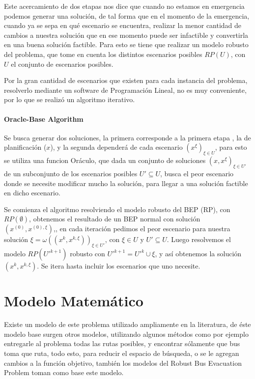 \documentclass[letter, 10pt]{article}
\begin{document}
Este acercamiento de dos etapas nos dice que cuando no estamos en emergencia podemos generar una solución, de tal forma que en el momento de la emergencia, cuando ya se sepa en qué escenario se encuentra, realizar la menor cantidad de cambios a nuestra solución que en ese momento puede ser infactible y convertirla en una buena solución factible. Para esto se tiene que realizar un modelo robusto del problema, que tome en cuenta los distintos escenarios posibles $RP(U)$, con $U$ el conjunto de escenarios posibles.

Por la gran cantidad de escenarios que existen para cada instancia del problema, resolverlo mediante un software de Programación Lineal, no es muy conveniente, por lo que se realizó un algoritmo iterativo.

\paragraph{Oracle-Base Algorithm}
Se busca generar dos soluciones, la primera corresponde a la primera etapa , la de planificación ($x$), y la segunda dependerá de cada escenario $(x^\xi)_{\xi \in U}$, para esto se utiliza una funcion Oráculo, que dada un conjunto de soluciones $(x,x^\xi)_{\xi \in U'}$ de un subconjunto de los escenarios posibles $U' \subseteq U$, busca el peor escenario donde se necesite modificar mucho la solución, para llegar a una solución factible en dicho escenario.

Se comienza el algoritmo resolviendo el modelo robusto del BEP (RP), con $RP(\emptyset)$, obtenemos el resultado de un BEP normal con solución $(x^{(0)},x^{(0),\xi}) $,, en cada iteración pedimos el peor escenario para nuestra solución $\xi = \omega((x^k , x^{k,\xi}))_{\xi \in U'}$, con $\xi \in U$ y $U' \subseteq U$. Luego resolvemos el modelo $RP(U'^{k+1})$ robusto con $U'^{k+1} = U'^{k} \cup \xi$, y así obtenemos la solución $(x^k, x^{k,\xi})$. Se itera hasta incluir los escenarios que uno necesite.


\section{Modelo Matem\'atico}
Existe un modelo de este problema utilizado ampliamente en la literatura, de éste modelo base surgen otros modelos, utilizando algunos métodos como por ejemplo entregarle al problema todas las rutas posibles, y encontrar sólamente que bus toma que ruta, todo esto, para reducir el espacio de búsqueda, o se le agregan cambios a la función objetivo, también los modelos del Robust Bus Evacuation Problem toman como base este modelo.
\end{document}
